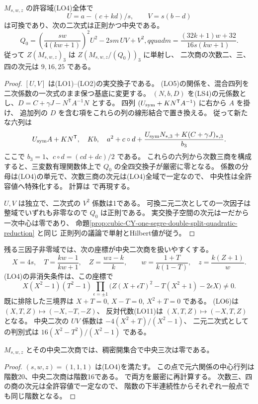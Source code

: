 \begin{proposition}\label{prop:cubic-CY-one-segre-square-split-M-quadratic}
$M_{s,w,z}$ の許容域(LO4)全体で
\[
 U=a-(c+kd)/s,\qquad V=s(b-d)
\]
は可換であり、次の二次式は正則かつ中央である。
\[
 Q_0=\left(\frac{sw}{4(kw+1)}\right)^2 U^2-2sm\,UV+V^2,qquad
 m=\frac{(32k+1)w+32}{16s(kw+1)} .
\]
従って $Z(M_{s,w,z})_3$ は $Z(M_{s,w,z}/(Q_0))_3$ に単射し、
二次商の次数二、三、四の次元は $9,16,25$ である。
\end{proposition}
\begin{proof}
$[U,V]$ は(LO1)--(LO2)の実交換子である。
(LO5)の関係を、混合四列を二次係数の一次式のまま保つ基底に変更する。
$(N,b,D)$ を(LS4)の元係数とし、$D=C+\gamma J-N^{\mathsf T}A^{-1}N$ とする。
四列 $(U_{\rm sym}+KN^{\mathsf T}A^{-1})$ に右から $A$ を掛け、
追加列の $D$ を含む項をこれらの列の線形結合で置き換える。
従って新たな六列は
\[
 U_{\rm sym}A+KN^{\mathsf T},\quad Kb,\quad
 a^2+c\circ d+
 \frac{U_{\rm sym}N_{*,3}+K(C+\gamma J)_{*,3}}{b_3} .
\]
ここで $b_3=1$、$c\circ d=(cd+dc)/2$ である。
これらの六列から次数三商を構成すると、三変数有理関数体上で
$Q_0$ の全四交換子が厳密に零となる。
係数の分母は(LO4)の単元で、次数三商の次元は(LO4)全域で一定なので、
中央性は全許容値へ特殊化する。
計算は  で再現する。

$U,V$ は独立で、二次式の $V^2$ 係数は1である。
可換二元二次としての一次因子は整域でいずれも非零なので $Q_0$ は正則である。
実交換子空間の次元は一だから一次中心は零であり、
命題\ref{prop:cubic-CY-one-segre-double-split-quadratic-reduction} と同じ
正則列の議論で単射とHilbert値が従う。
\end{proof}

残る三因子非零域では、次の座標が中央二次商を扱いやすくする。
\[
 X=4s,\quad T=\frac{kw-1}{kw+1},\quad Z=\frac{wz-k}{k},\qquad
 w=\frac{1+T}{k(1-T)},\quad z=\frac{k(Z+1)}{w}.
\]
(LO4)の非消失条件は、この座標で
\[
 X(X^2-1)(T^2-1)
 \prod_{\epsilon=\pm1}
 \bigl(Z(X+\epsilon T)^2-T(X^2+1)-2\epsilon X\bigr)\ne0 .
\]
既に排除した三境界は $X+T=0$, $X-T=0$, $X^2+T=0$ である。
(LO6)は $(X,T,Z)\mapsto(-X,-T,-Z)$、
反対代数(LO11)は $(X,T,Z)\mapsto(-X,T,Z)$ となる。
中央二次の $UV$ 係数は $-4(X^2+T)/(X^2-1)$、
二元二次式としての判別式は $16(X^2-T^2)/(X^2-1)$ である。

\begin{corollary}\label{cor:cubic-CY-one-segre-square-split-M-generic-zero}
$M_{s,w,z}$ とその中央二次商では、稠密開集合で中央三次は零である。
\end{corollary}
\begin{proof}
$(s,w,z)=(1,1,1)$ は(LO4)を満たす。
この点で元六関係の中心行列は階数20、中央二次商は階数16である。
 で両方を厳密に再計算する。
次数三、四の商の次元は全許容値で一定なので、
階数の下半連続性からそれぞれ一般点でも同じ階数となる。
\end{proof}

